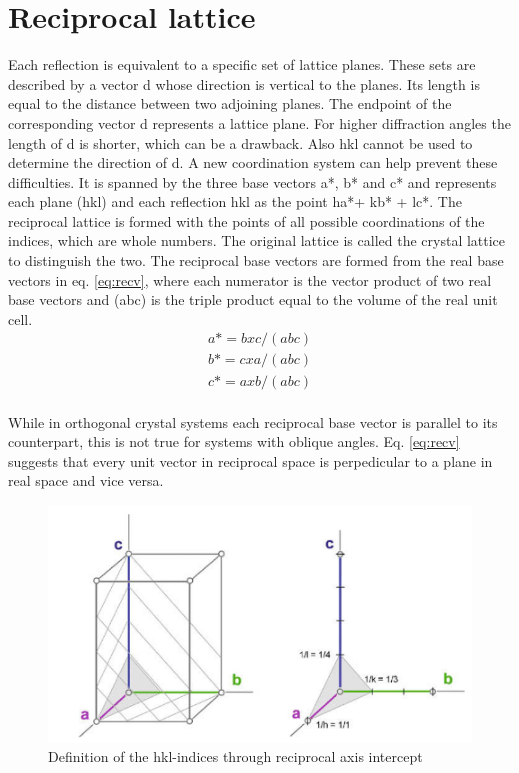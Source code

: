 \section{Reciprocal lattice}
Each reflection is equivalent to a specific set of lattice planes. These sets are described by a vector d whose direction is vertical to the planes. Its length is equal to the distance between two adjoining planes. The endpoint of the corresponding vector d represents a lattice plane. For higher diffraction angles the length of d is shorter, which can be a drawback. Also hkl cannot be used to determine the direction of d. A new coordination system can help prevent these difficulties. It is spanned by the three base vectors a*, b* and c* and represents each plane (hkl) and each reflection hkl as the point ha*+ kb* + lc*. The reciprocal lattice is formed with the points of all possible coordinations of the indices, which are whole numbers. The original lattice is called the crystal lattice to distinguish the two.  The reciprocal base vectors are formed from the real base vectors in eq. \ref{eq:recv}, where each numerator is the vector product of two real base vectors and (abc) is the triple product equal to the volume of the real unit cell.
\begin{equation}
\begin{split}
a* =b x c/(abc)\\
b* = c x a/(abc)\\
c* = a x b/(abc)\\
\end{split}
\label{eq:recv}
\end{equation} 

 While in orthogonal crystal systems each reciprocal base vector is parallel to its counterpart, this is not true for systems with  oblique angles. Eq. \ref{eq:recv} suggests that every unit vector in reciprocal space is perpedicular to a plane in real space and vice versa. 

 \begin{figure}[htpb!]
\centering
\includegraphics{figures/hkl-indices.png}
\caption{Definition of the hkl-indices through reciprocal axis intercept \cite{massa}}
\label{fig:hkl}
\end{figure}

